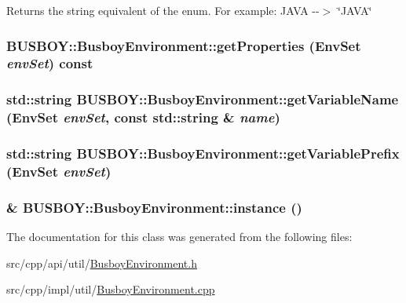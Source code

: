 Returns the string equivalent of the enum. For example: JAVA -\/-\/$>$ \char`\"{}JAVA\char`\"{} \hypertarget{classBUSBOY_1_1BusboyEnvironment_a92b3d872e87465d4d566ef02d5a1a2c1}{
\subsubsection[{getProperties}]{ BUSBOY::BusboyEnvironment::getProperties ({\bf EnvSet} {\em envSet}) const}}
\label{classBUSBOY_1_1BusboyEnvironment_a92b3d872e87465d4d566ef02d5a1a2c1}
\hypertarget{classBUSBOY_1_1BusboyEnvironment_ad856c8aeab75e7498f50b8ee9b5b70a5}{
\subsubsection[{getVariableName}]{\setlength{\rightskip}{0pt plus 5cm}std::string BUSBOY::BusboyEnvironment::getVariableName ({\bf EnvSet} {\em envSet}, \/  const std::string \& {\em name})}}
\label{classBUSBOY_1_1BusboyEnvironment_ad856c8aeab75e7498f50b8ee9b5b70a5}
\hypertarget{classBUSBOY_1_1BusboyEnvironment_a29a094cb93bb81775005cf2ad71106e2}{
\subsubsection[{getVariablePrefix}]{\setlength{\rightskip}{0pt plus 5cm}std::string BUSBOY::BusboyEnvironment::getVariablePrefix ({\bf EnvSet} {\em envSet})}}
\label{classBUSBOY_1_1BusboyEnvironment_a29a094cb93bb81775005cf2ad71106e2}
\hypertarget{classBUSBOY_1_1BusboyEnvironment_a06ca687507e5be7e839aa4d4de5f8931}{
\subsubsection[{instance}]{ \& BUSBOY::BusboyEnvironment::instance ()}}
\label{classBUSBOY_1_1BusboyEnvironment_a06ca687507e5be7e839aa4d4de5f8931}


The documentation for this class was generated from the following files:\begin{DoxyCompactItemize}
\item 
src/cpp/api/util/\hyperlink{BusboyEnvironment_8h}{BusboyEnvironment.h}\item 
src/cpp/impl/util/\hyperlink{BusboyEnvironment_8cpp}{BusboyEnvironment.cpp}\end{DoxyCompactItemize}
